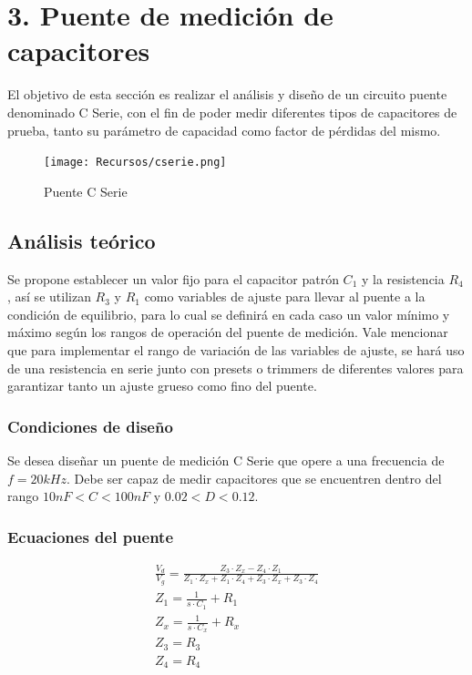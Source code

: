 
\section{3. Puente de medici\'on de capacitores}
El objetivo de esta secci\'on es realizar el an\'alisis y dise\~no de un circuito puente denominado C Serie, con el fin de poder medir diferentes tipos de capacitores de prueba, tanto su par\'ametro de capacidad como factor de p\'erdidas del mismo.

\begin{figure}[H]
    \centering
    \texttt{[image: Recursos/cserie.png]}
    \caption{Puente C Serie}
    \label{fig:puente_c_serie}
\end{figure}

\subsection{An\'alisis te\'orico}
Se propone establecer un valor fijo para el capacitor patr\'on $C_1$ y la resistencia $R_4$, as\'i se utilizan $R_3$ y $R_1$ como variables de ajuste para llevar al puente a la condici\'on de equilibrio, para lo cual se definir\'a en cada caso un valor m\'inimo y m\'aximo seg\'un los rangos de operaci\'on del puente de medici\'on. 
Vale mencionar que para implementar el rango de variaci\'on de las variables de ajuste, se har\'a uso de una resistencia en serie junto con presets o trimmers de diferentes valores para garantizar tanto un ajuste grueso como fino del puente.

\subsubsection{Condiciones de dise\~no}
Se desea dise\~nar un puente de medici\'on C Serie que opere a una frecuencia de $f = 20kHz$. Debe ser capaz de medir capacitores que se encuentren dentro del rango $10nF < C < 100nF$ y $0.02 < D < 0.12$.

\subsubsection{Ecuaciones del puente}
\begin{equation}
\begin{array}{lllll}
    \frac{V_d}{V_g} = \frac{Z_3\cdot Z_x - Z_4 \cdot Z_1}{Z_1 \cdot Z_x + Z_1 \cdot Z_4 + Z_3\cdot Z_x + Z_3 \cdot Z_4}\\
    Z_1 = \frac{1}{s\cdot C_1} + R_1\\
    Z_x = \frac{1}{s\cdot C_x} + R_x\\
    Z_3 = R_3\\
    Z_4 = R_4\\
\label{eq:Ec_puente}
\end{array}
\end{equation}

